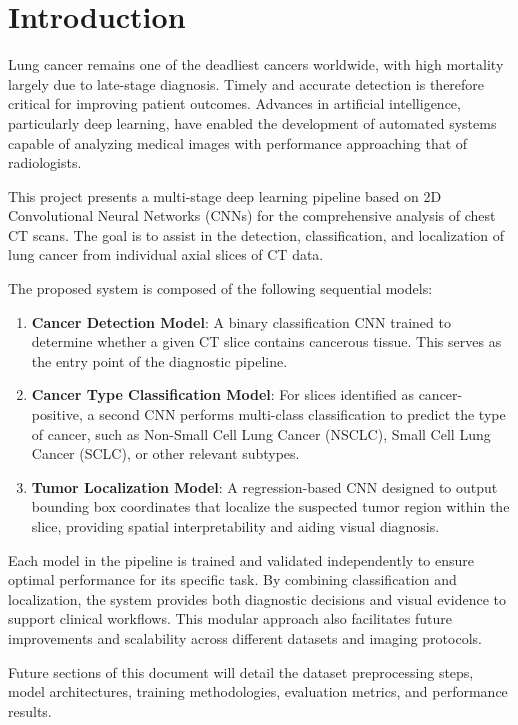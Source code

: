 \section{Introduction}

Lung cancer remains one of the deadliest cancers worldwide, with high mortality largely due to 
late-stage diagnosis. Timely and accurate detection is therefore critical for improving patient 
outcomes. Advances in artificial intelligence, particularly deep learning, have enabled the 
development of automated systems capable of analyzing medical images with performance approaching 
that of radiologists.

This project presents a multi-stage deep learning pipeline based on 2D Convolutional Neural Networks 
(CNNs) for the comprehensive analysis of chest CT scans. The goal is to assist in the detection, 
classification, and localization of lung cancer from individual axial slices of CT data.

The proposed system is composed of the following sequential models:

\begin{enumerate}
    \item \textbf{Cancer Detection Model}: A binary classification CNN trained to determine whether 
    a given CT slice contains cancerous tissue. This serves as the entry point of the diagnostic 
    pipeline.
    
    \item \textbf{Cancer Type Classification Model}: For slices identified as cancer-positive, a 
    second CNN performs multi-class classification to predict the type of cancer, such as Non-Small 
    Cell Lung Cancer (NSCLC), Small Cell Lung Cancer (SCLC), or other relevant subtypes.
    
    \item \textbf{Tumor Localization Model}: A regression-based CNN designed to output bounding box 
    coordinates that localize the suspected tumor region within the slice, providing spatial 
    interpretability and aiding visual diagnosis.
\end{enumerate}

Each model in the pipeline is trained and validated independently to ensure optimal performance for 
its specific task. By combining classification and localization, the system provides both diagnostic 
decisions and visual evidence to support clinical workflows. This modular approach also facilitates 
future improvements and scalability across different datasets and imaging protocols.

Future sections of this document will detail the dataset preprocessing steps, model architectures, 
training methodologies, evaluation metrics, and performance results.
